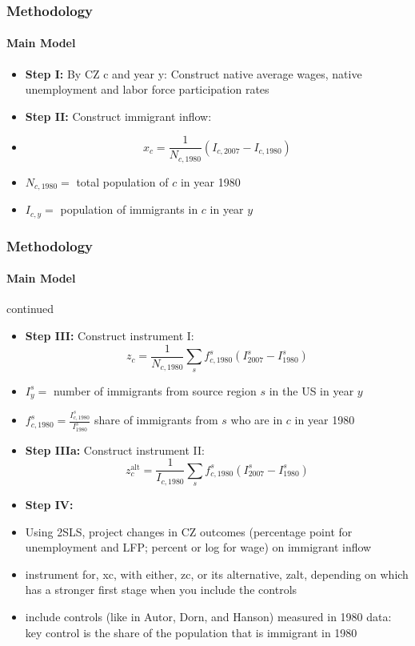 \begin{frame}
    \frametitle{Methodology}
    \framesubtitle{Main Model}
    \begin{itemize}
        \item \textbf{Step I:} By CZ c and year y: Construct native average wages, native unemployment and labor force participation rates
    \end{itemize}
    \begin{itemize}
        \item \textbf{Step II:} Construct immigrant inflow: 
        \item \[x_c = \frac{1}{N_{c,1980}} \left(I_{c,2007} - I_{c,1980}\right)\]
    \end{itemize}
    \begin{itemize}
        \item $N_{c,1980} = $ total population of $c$ in year 1980
        \item $I_{c,y} = $ population of immigrants in $c$ in year $y$
    \end{itemize}
\end{frame}
\begin{frame}
    \frametitle{Methodology}
    \framesubtitle{Main Model} continued
    \begin{itemize}
        \item \textbf{Step III:} Construct instrument I:
        \[z_c = \frac{1}{N_{c,1980}} \sum_s f^s_{c,1980} \left(I^s_{2007} - I^s_{1980}\right)\]
    \end{itemize}
    \begin{itemize}
        \item $I^s_y = $ number of immigrants from source region $s$ in the US in year $y$
        \item $f^s_{c,1980} = \frac{I^s_{c,1980}}{I^s_{1980}}$ share of immigrants from $s$ who are in $c$ in year 1980
    \end{itemize}
    \begin{itemize}
        \item \textbf{Step IIIa:} Construct instrument II:
        \[z_c^{\text{alt}} = \frac{1}{I_{c,1980}} \sum_s f^s_{c,1980} \left(I^s_{2007} - I^s_{1980}\right)\]
    \end{itemize}
    \begin{itemize}
        \item \textbf{Step IV:} 
        \item Using 2SLS, project changes in CZ outcomes (percentage point for unemployment and LFP; percent or log for wage) on immigrant inflow
        \item instrument for, xc, with either, zc, or its alternative, zalt, depending on which has a
        stronger first stage when you include the controls
        \item include controls (like in Autor, Dorn, and Hanson) measured in 1980 data: key control is the share of the population that is immigrant in 1980
    \end{itemize}
\end{frame}

